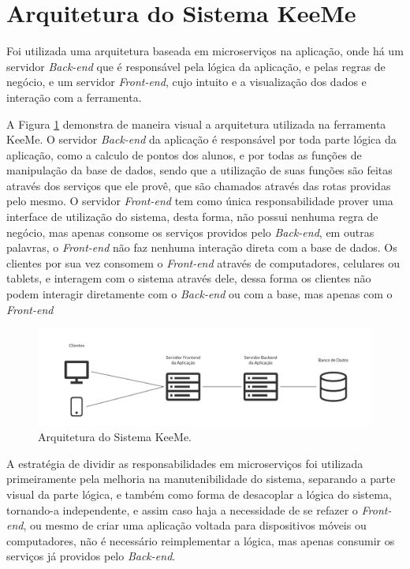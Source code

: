 \section{Arquitetura do Sistema KeeMe}
\label{sec:arquiteturaDoSistema}

Foi utilizada uma arquitetura baseada em microserviços na aplicação, onde há um servidor \textit{Back-end} que é responsável pela lógica da aplicação, e pelas regras de negócio, e um servidor \textit{Front-end}, cujo intuito e a visualização dos dados e interação com a ferramenta.

A Figura \ref{fig:arquiteturaKeeme} demonstra de maneira visual a arquitetura utilizada na ferramenta KeeMe. O servidor \textit{Back-end} da aplicação é responsável por toda parte lógica da aplicação, como a calculo de pontos dos alunos, e por todas as funções de manipulação da base de dados, sendo que a utilização de suas funções são feitas através dos serviços que ele provê, que são chamados através das rotas providas pelo mesmo. O servidor \textit{Front-end} tem como única responsabilidade prover uma interface de utilização do sistema, desta forma, não possui nenhuma regra de negócio, mas apenas consome os serviços providos pelo \textit{Back-end}, em outras palavras, o \textit{Front-end} não faz nenhuma interação direta com a base de dados. Os clientes por sua vez consomem o \textit{Front-end} através de computadores, celulares ou tablets, e interagem com o sistema através dele, dessa forma os clientes não podem interagir diretamente com o \textit{Back-end} ou com a base, mas apenas com o \textit{Front-end}

\begin{figure}[H]
    \centering
    \includegraphics[width=\textwidth]{dados/figuras/Proposta/arquitetura_keeme.pdf}
    \caption{Arquitetura do Sistema KeeMe.}
    \label{fig:arquiteturaKeeme}
\end{figure}

A estratégia de dividir as responsabilidades em microserviços foi utilizada primeiramente pela melhoria na manutenibilidade do sistema, separando a parte visual da parte lógica, e também como forma de desacoplar a lógica do sistema, tornando-a independente, e assim caso haja a necessidade de se refazer o \textit{Front-end}, ou mesmo de criar uma aplicação voltada para dispositivos móveis ou computadores, não é necessário reimplementar a lógica, mas apenas consumir os serviços já providos pelo \textit{Back-end}.

